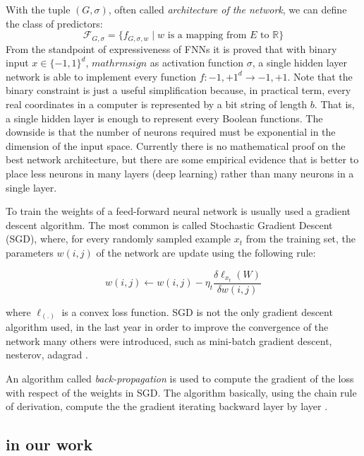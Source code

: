 With the tuple $(G, \sigma)$, often called \emph{architecture of the network}, we can define the class of predictors: 
\[ \mathcal{F}_{G, \sigma} = \{ f_{G, \sigma, w} \mid w \textrm{ is a mapping from } E \textrm{ to } \mathbb R \} \]
From the standpoint of expressiveness of FNNs it is proved that with binary input $x \in \{-1, 1\}^d$, $mathrm{sign}$ as activation
function $\sigma$, a single hidden layer network is able to
implement every function $f: {-1, +1}^d \to {-1, +1}$. Note that the
binary constraint is just a useful simplification because, in
practical term, every real coordinates in a computer is represented
by a bit string of length $b$. That is, a single hidden layer is
enough to represent every Boolean functions. The downside is that
the number of neurons required must be exponential in the dimension
of the input space. Currently there is no mathematical proof on the
best network architecture, but there are some empirical evidence
that is better to place less neurons in many layers (deep learning)
rather than many neurons in a single layer. %

To train the weights of a feed-forward neural network is usually
used a gradient descent algorithm. The most common is called
Stochastic Gradient Descent (SGD), where, for every randomly sampled
example $x_t$ from the training set, the parameters $w(i, j)$ of the
network are update using the following rule:

\begin{equation} \label{eq:sgd} 
w(i, j) \leftarrow w(i, j) -  \eta_t \frac{\delta\ell_{x_t}(W)}{\delta w(i, j )}
\end{equation}

where $\ell_(.)$ is a convex loss function. SGD is not the only
gradient descent algorithm used, in the last year in order to
improve the convergence of the network many others were introduced,
such as mini-batch gradient descent, nesterov, adagrad
\cite{RuderGDOpt}. 

An algorithm called \emph{back-propagation} is used to compute the
gradient of the loss with respect of the weights in SGD. The
algorithm basically, using the chain rule of derivation, compute the
the gradient iterating backward layer by layer
\cite{HintonBackProp}.

\subsection{in our work}

